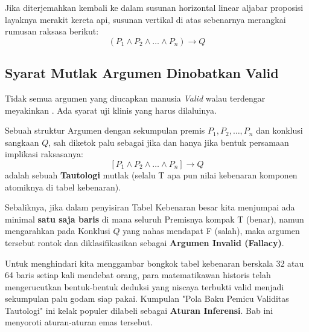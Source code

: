 Jika diterjemahkan kembali ke dalam susunan horizontal linear aljabar proposisi layaknya merakit kereta api, susunan vertikal di atas sebenarnya merangkai rumusan raksasa berikut:
\[ (P_1 \wedge P_2 \wedge \ldots \wedge P_n) \rightarrow Q \]

\subsection{Syarat Mutlak Argumen Dinobatkan Valid}

Tidak semua argumen yang diucapkan manusia \textit{Valid} walau terdengar meyakinkan \cite{wiki_first_order_logic}. Ada syarat uji klinis yang harus dilaluinya.

\begin{teorema}
Sebuah struktur Argumen dengan sekumpulan premis $P_1, P_2, \ldots, P_n$ dan konklusi sangkaan $Q$, sah diketok palu sebagai  jika dan hanya jika bentuk persamaan implikasi raksasanya:
\[ [P_1 \wedge P_2 \wedge \ldots \wedge P_n] \rightarrow Q \]
adalah sebuah \textbf{Tautologi} mutlak (selalu T apa pun nilai kebenaran komponen atomiknya di tabel kebenaran).
\end{teorema}

Sebaliknya, jika dalam penyisiran Tabel Kebenaran besar kita menjumpai ada minimal \textbf{satu saja baris} di mana seluruh Premisnya kompak T (benar), namun mengarahkan pada Konklusi $Q$ yang nahas mendapat F (salah), maka argumen tersebut rontok dan diklasifikasikan sebagai \textbf{Argumen Invalid (Fallacy)}.

Untuk menghindari kita menggambar bongkok tabel kebenaran berskala 32 atau 64 baris setiap kali mendebat orang, para matematikawan historis telah mengerucutkan bentuk-bentuk deduksi yang niscaya terbukti valid menjadi sekumpulan palu godam siap pakai. Kumpulan "Pola Baku Pemicu Validitas Tautologi" ini kelak populer dilabeli sebagai \textbf{Aturan Inferensi}. Bab ini menyoroti aturan-aturan emas tersebut.
